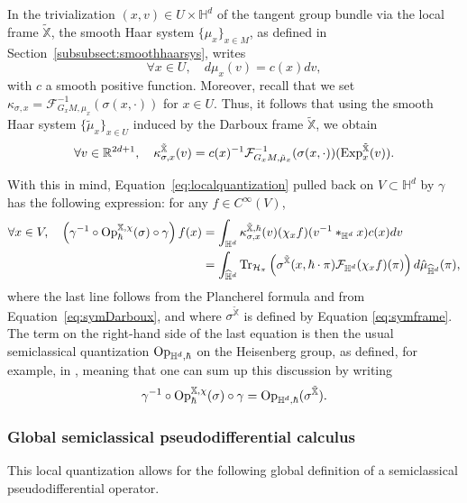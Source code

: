 \documentclass[12pt,a4paper]{amsart}
\theoremstyle{plain}
\theoremstyle{definition}
\theoremstyle{remark}
\numberwithin{equation}{section}
\theoremstyle{definition}
\def\R{{\mathbb R}}%
\def \Op{{\rm Op}}
\def \bX{\mathbb{X}}
\def \Heis{\mathbb{H}}
\def \Hhat{\widehat{\Heis}}
\def \cF{\mathcal{F}}
\numberwithin{equation}{section}
\begin{document}
In the trivialization $(x,v)\in U\times\Heis^d$ of the tangent group bundle via the local frame $\tilde{\bX}$, the smooth Haar system $\{\mu_x\}_{x\in M}$, as defined in Section~\ref{subsubsect:smoothhaarsys}, writes
\begin{equation*}
    \forall x\in U,\quad d\mu_x(v) = c(x)dv,
\end{equation*}
with $c$ a smooth positive function. Moreover, recall that we set $\kappa_{\sigma,x} = \cF_{G_x M, \mu_x}^{-1}(\sigma(x,\cdot))$ for $x\in U$. Thus, it follows that using the smooth Haar system $\{\tilde{\mu}_x\}_{x\in U}$ induced by the Darboux frame $\tilde{\bX}$, we obtain
\begin{equation}
    \label{eq:symDarboux}
    \forall v\in \R^{2d+1},\quad\kappa_{\sigma,x}^{\tilde{\bX}}(v) = c(x)^{-1}\mathcal{F}_{G_x M, \tilde{\mu}_x}^{-1}(\sigma(x,\cdot))({\rm Exp}_x^{\tilde{\bX}}(v)).
\end{equation}

With this in mind, Equation~\eqref{eq:localquantization} pulled back on $V\subset \Heis^d$ by $\gamma$ has the following expression: for any $f\in C^\infty(V)$,
\begin{equation*}
    \begin{aligned}
    \forall x\in V,\quad\left(\gamma^{-1}\circ\Op_{\hbar}^{\bX,\chi}(\sigma)\circ \gamma \right)f(x) &= \int_{\Heis^d} \kappa_{\sigma,x}^{\tilde{\bX},\hbar}(v)(\chi_x f)(v^{-1}*_{\Heis^d}x)c(x)dv\\
    &= \int_{\Hhat^d}{\rm Tr}_{\mathcal{H}_\pi}\left(\sigma^{\tilde{\bX}}(x,\hbar\cdot\pi)\mathcal{F}_{\Heis^d}(\chi_x f)(\pi)\right)d\hat{\mu}_{\Hhat^d}(\pi),
    \end{aligned}
\end{equation*}
where the last line follows from the Plancherel formula and from Equation~\eqref{eq:symDarboux}, and where $\sigma^{\tilde{\bX}}$ is defined by Equation \eqref{eq:symframe}. The term on the right-hand side of the last equation is then the usual semiclassical quantization $\Op_{\Heis^d,\hbar}$ on the Heisenberg group, as defined, for example, in \cite{FKF19}, meaning that one can sum up this discussion by writing
\begin{equation}
\label{eq:equivquantizations}
    \gamma^{-1}\circ\Op_{\hbar}^{\bX,\chi}(\sigma)\circ \gamma = \Op_{\Heis^d,\hbar}(\sigma^{\tilde{\bX}}).
\end{equation}

\subsubsection{Global semiclassical pseudodifferential calculus}
This local quantization allows for the following global definition of a semiclassical pseudodifferential operator.
\end{document}
